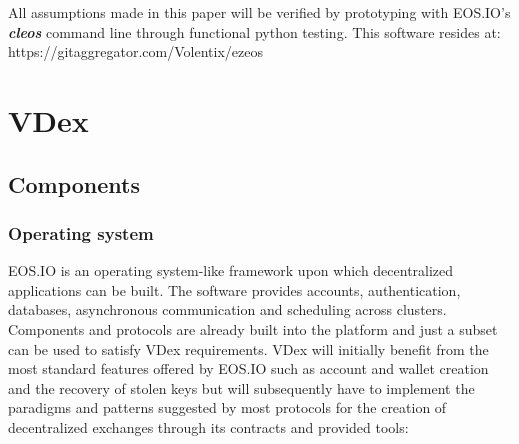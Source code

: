 \documentclass[]{article}
\begin{document}
All assumptions made in this paper will be verified by prototyping
with EOS.IO's \textbf{\textit{cleos}} command line through functional python testing. This software resides at: https://gitaggregator.com/Volentix/ezeos

\section{VDex}	
	 
\subsection{Components}
	
	\subsubsection{Operating system}
	EOS.IO is an operating system-like framework upon which decentralized applications can be built. The software provides accounts, authentication, databases, asynchronous communication and scheduling across clusters. 
	Components and protocols are already built into the platform and just a subset can be used to satisfy VDex requirements.
	VDex will initially benefit from the most standard features offered by EOS.IO such as account and wallet creation and the recovery of stolen keys but will subsequently have to implement the paradigms and patterns suggested by most protocols for the creation of decentralized exchanges through its contracts and provided tools:	\cite{3}\\
  
\end{document}
